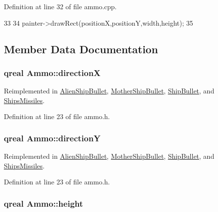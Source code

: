 Definition at line 32 of file ammo.cpp.


\begin{DoxyCode}
33 {
34     painter->drawRect(positionX,positionY,width,height);
35 }
\end{DoxyCode}


\subsection{Member Data Documentation}
\hypertarget{class_ammo_a60392d67523d0cf6d46e14b6b3f1ae05}{
\subsubsection[{directionX}]{\setlength{\rightskip}{0pt plus 5cm}qreal {\bf Ammo::directionX}}}
\label{class_ammo_a60392d67523d0cf6d46e14b6b3f1ae05}


Reimplemented in \hyperlink{class_alien_ship_bullet_ac5b78fb52df900ec79a2c480410dc3ca}{AlienShipBullet}, \hyperlink{class_mother_ship_bullet_a7595f4bddbfe83bb5467adc3d06b24a7}{MotherShipBullet}, \hyperlink{class_ship_bullet_a5f2086fa76ca48a99e7b6b53592b9ab0}{ShipBullet}, and \hyperlink{class_ships_missiles_aad45d407d327d29bd616ca336197fe30}{ShipsMissiles}.

Definition at line 23 of file ammo.h.\hypertarget{class_ammo_a1156ff1439690bf121841528585aa026}{
\subsubsection[{directionY}]{\setlength{\rightskip}{0pt plus 5cm}qreal {\bf Ammo::directionY}}}
\label{class_ammo_a1156ff1439690bf121841528585aa026}


Reimplemented in \hyperlink{class_alien_ship_bullet_a807486b1f3903b772f6d31294b258edb}{AlienShipBullet}, \hyperlink{class_mother_ship_bullet_a886c10db617ba9341d34487514ffd79f}{MotherShipBullet}, \hyperlink{class_ship_bullet_a091f76850ba260f2a306d5dc7e69bd1b}{ShipBullet}, and \hyperlink{class_ships_missiles_af7e77e3dd68cb9f8d6cb90467a2a3ff0}{ShipsMissiles}.

Definition at line 23 of file ammo.h.\hypertarget{class_ammo_a7ee07e5c3778fe15aeef8126a5251e3b}{
\subsubsection[{height}]{\setlength{\rightskip}{0pt plus 5cm}qreal {\bf Ammo::height}}}
\label{class_ammo_a7ee07e5c3778fe15aeef8126a5251e3b}



